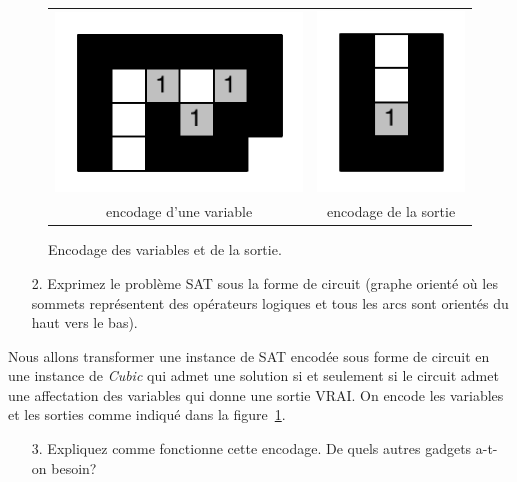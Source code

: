 \documentclass[12pt]{article}
\begin{document}
\begin{figure}[h]
\begin{center}
  \begin{tabular}{c c}
    \includegraphics[scale=0.65]{./figures/variable} &
    \includegraphics[scale=0.65]{./figures/fil}\\
 encodage d'une variable &
 encodage de la sortie
 \end{tabular}
\end{center}
 \caption{Encodage des variables et de la sortie.}
 \label{debutfin}
\end{figure}

\begin{enumerate}
\item[2.] Exprimez le problème SAT sous la forme de circuit (graphe orienté où les sommets représentent des opérateurs logiques et tous les arcs sont orientés du haut vers le bas).
\end{enumerate}

Nous allons transformer une instance de SAT encodée sous forme de circuit en une instance de \textit{Cubic} qui admet une solution si et seulement si le circuit admet une affectation des variables qui donne une sortie VRAI. On encode les variables et les sorties comme indiqué dans la figure~\ref{debutfin}.


\begin{enumerate}
\item[3.] Expliquez comme fonctionne cette encodage. De quels autres gadgets a-t-on besoin?
\end{enumerate}
\end{document}
